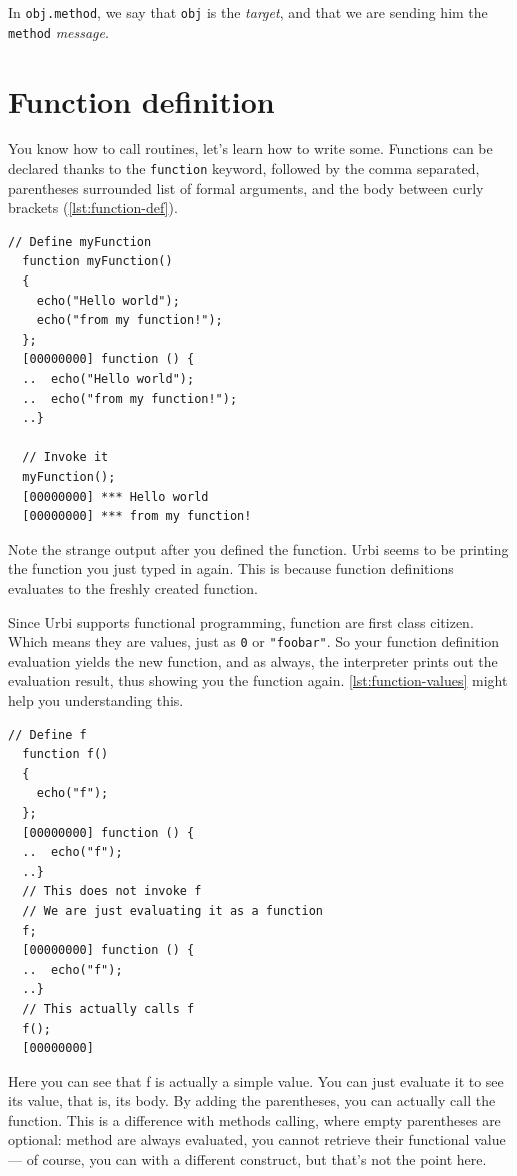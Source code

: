\documentclass[openright,twoside,12pt]{report}
\newcommand{\urbi}{Urbi\xspace}
\newcommand{\lst}[1]{\autoref{lst:#1}}
\begin{document}
In \lstinline|obj.method|, we say that \texttt{obj} is the {\em
  target}, and that we are sending him the \texttt{method} {\em
  message}.

\section{Function definition}

You know how to call routines, let's learn how to write
some. Functions can be declared thanks to the \texttt{function}
keyword, followed by the comma separated, parentheses surrounded list
of formal arguments, and the body between curly brackets (\lst{function-def}).

\begin{lstlisting}[caption=Defining a function,label=lst:function-def]
  // Define myFunction
  function myFunction()
  {
    echo("Hello world");
    echo("from my function!");
  };
  [00000000] function () {
  ..  echo("Hello world");
  ..  echo("from my function!");
  ..}

  // Invoke it
  myFunction();
  [00000000] *** Hello world
  [00000000] *** from my function!
\end{lstlisting}

Note the strange output after you defined the function. \urbi seems to
be printing the function you just typed in again. This is because
function definitions evaluates to the freshly created function.

Since \urbi supports functional programming, function are first class
citizen. Which means they are values, just as \texttt{0} or
\texttt{"foobar"}. So your function definition evaluation yields the
new function, and as always, the interpreter prints out the evaluation
result, thus showing you the function again. \lst{function-values}
might help you understanding this.


\begin{lstlisting}[caption=Function as values,label=lst:function-values]
  // Define f
  function f()
  {
    echo("f");
  };
  [00000000] function () {
  ..  echo("f");
  ..}
  // This does not invoke f
  // We are just evaluating it as a function
  f;
  [00000000] function () {
  ..  echo("f");
  ..}
  // This actually calls f
  f();
  [00000000]
\end{lstlisting}

Here you can see that f is actually a simple value. You can just
evaluate it to see its value, that is, its body. By adding the
parentheses, you can actually call the function. This is a difference
with methods calling, where empty parentheses are optional: method are
always evaluated, you cannot retrieve their functional value --- of
course, you can with a different construct, but that's not the point
here.
\end{document}
